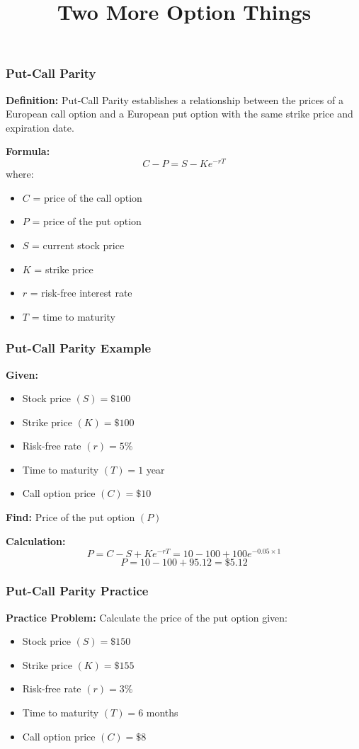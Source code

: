 \documentclass{beamer}
\title{Two More Option Things}
\author{}
\date{}
\begin{document}
\maketitle
\begin{frame}
\frametitle{Put-Call Parity}

\textbf{Definition:} Put-Call Parity establishes a relationship between the prices of a European call option and a European put option with the same strike price and expiration date.

\textbf{Formula:}
\[ C - P = S - K e^{-rT} \]
where:
\begin{itemize}
  \item $C$ = price of the call option
  \item $P$ = price of the put option
  \item $S$ = current stock price
  \item $K$ = strike price
  \item $r$ = risk-free interest rate
  \item $T$ = time to maturity
\end{itemize}

\end{frame}

\begin{frame}
\frametitle{Put-Call Parity Example}

\textbf{Given:}
\begin{itemize}
  \item Stock price $(S) = \$100$
  \item Strike price $(K) = \$100$
  \item Risk-free rate $(r) = 5\%$
  \item Time to maturity $(T) = 1$ year
  \item Call option price $(C) = \$10$
\end{itemize}

\textbf{Find:} Price of the put option $(P)$

\textbf{Calculation:}
\[ P = C - S + K e^{-rT} = 10 - 100 + 100 e^{-0.05 \times 1} \]
\[ P = 10 - 100 + 95.12 = \$5.12 \]

\end{frame}

\begin{frame}
\frametitle{Put-Call Parity Practice}

\textbf{Practice Problem:}
Calculate the price of the put option given:
\begin{itemize}
  \item Stock price $(S) = \$150$
  \item Strike price $(K) = \$155$
  \item Risk-free rate $(r) = 3\%$
  \item Time to maturity $(T) = 6$ months
  \item Call option price $(C) = \$8$
\end{itemize}
\end{frame}
\end{document}
